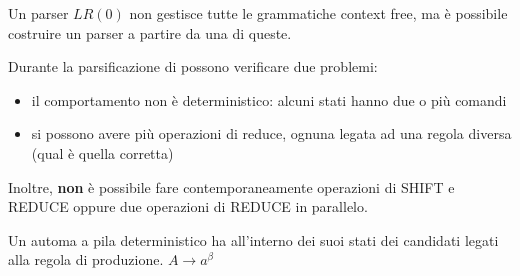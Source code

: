 \documentclass[11pt]{article}
\begin{document}
Un parser $LR(0)$ non gestisce tutte le grammatiche context free, ma è possibile costruire un parser a partire da una di
queste.

Durante la parsificazione di possono verificare due problemi:
\begin{itemize}
    \item il comportamento non è deterministico: alcuni stati hanno due o più comandi
    \item si possono avere più operazioni di reduce, ognuna legata ad una regola diversa (qual è quella corretta)
\end{itemize}
Inoltre, \textbf{non} è possibile fare contemporaneamente operazioni di SHIFT e REDUCE oppure due operazioni di REDUCE in 
parallelo.

Un automa a pila deterministico ha all'interno dei suoi stati dei candidati legati alla regola di produzione.
$A\rightarrow a^\beta$
\end{document}
